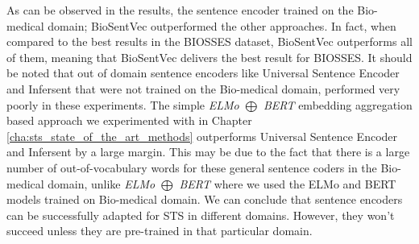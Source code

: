 \begin{table}[htb]
	\centering
	\caption[Results comparison for BIOSSES with different sentence encoders]{Results for BIOSSES dataset with different sentence encoders compared with top results reported for BIOSSES. Additionally, we report the results of the best model from Chapter \ref{cha:sts_state_of_the_art_methods}; \textit{ELMo $\bigoplus$ BERT}. For each variant, Pearson Correlation ($\bm{\rho}$) is reported between the predicted values and the gold labels of the test set. The best result is marked with ${\dagger}$.}  
	\label{tab:biosses_sentence_encoders}
\end{table} 

As can be observed in the results, the sentence encoder trained on the Bio-medical domain; BioSentVec \autocite{8904728} outperformed the other approaches. In fact, when compared to the best results in the BIOSSES dataset, BioSentVec outperforms all of them, meaning that BioSentVec delivers the best result for BIOSSES. It should be noted that out of domain sentence encoders like Universal Sentence Encoder and Infersent that were not trained on the Bio-medical domain, performed very poorly in these experiments. The simple \textit{ELMo $\bigoplus$ BERT} embedding aggregation based approach we experimented with in Chapter \ref{cha:sts_state_of_the_art_methods} outperforms Universal Sentence Encoder and Infersent by a large margin. This may be due to the fact that there is a large number of out-of-vocabulary words for these general sentence coders in the Bio-medical domain, unlike \textit{ELMo $\bigoplus$ BERT} where we used the ELMo and BERT models trained on Bio-medical domain. We can conclude that sentence encoders can be successfully adapted for STS in different domains. However, they won't succeed unless they are pre-trained in that particular domain. 

